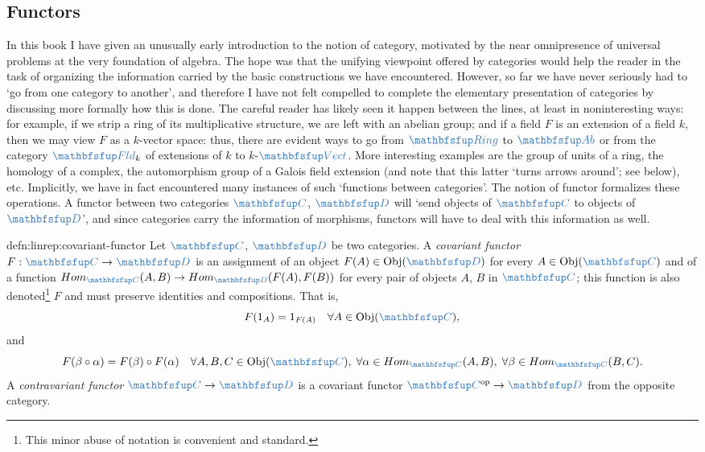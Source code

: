 \subsection{Functors}
\label{subsec:linrep:functors}
In this book I have given an unusually early introduction to the
notion of category, motivated by the near omnipresence of universal
problems at the very foundation of algebra. The hope was that the
unifying viewpoint offered by categories would help the reader in the
task of organizing the information carried by the basic constructions
we have encountered.  However, so far we have never seriously had to
`go from one category to another', and therefore I have not felt
compelled to complete the elementary presentation of categories by
discussing more formally how this is done. The careful reader has
likely seen it happen between the lines, at least in noninteresting
ways: for example, if we strip a ring of its multiplicative structure,
we are left with an abelian group; and if a field $F$ is an extension
of a field $k$, then we may view $F$ as a $k$-vector space: thus,
there are evident ways to go from $\categ{Ring}$ to $\categ{Ab}$ or
from the category $\categ{Fld}_k$ of extensions of $k$ to
$k$-$\categ{Vect}$. More interesting examples are the group of units
of a ring, the homology of a complex, the automorphism group of a
Galois field extension (and note that this latter `turns arrows
around'; see below), etc. Implicitly, we have in fact encountered many
instances of such `functions between categories'.  The notion of
functor formalizes these operations. A functor between two categories
$\categ{C}$, $\categ{D}$ will `send objects of $\categ{C}$ to objects
of $\categ{D}$', and since categories carry the information of
morphisms, functors will have to deal with this information as well.
\begin{defn}{}{defn:linrep:covariant-functor}
  Let $\categ{C}$, $\categ{D}$ be two categories. A \emph{covariant
    functor} $F : \categ{C} \to \categ{D}$ is an assignment of an
  object $F(A) \in \mathrm{Obj}(\categ{D})$ for every
  $A \in \mathrm{Obj}(\categ{C})$ and of a function
  $\Hom_{\categ{C}}(A, B) \to \Hom_{\categ{D}}(F(A), F(B))$ for every
  pair of objects $A$, $B$ in $\categ{C}$; this function is also
  denoted\footnote{This minor abuse of notation is convenient and
    standard.} $F$ and must preserve identities and compositions. That
  is,
  \[
    F(1_A) = 1_{F(A)} \quad \forall A \in \mathrm{Obj}(\categ{C}),
  \]
  and
  \[
    F(\beta \circ \alpha) = F(\beta) \circ F(\alpha) \quad \forall A,
    B, C \in \mathrm{Obj}(\categ{C}),\; \forall \alpha \in
    \Hom_{\categ{C}}(A, B),\; \forall \beta \in \Hom_{\categ{C}}(B,
    C).
  \]
  A \emph{contravariant functor} $\categ{C} \to \categ{D}$ is a
  covariant functor $\categ{C}^{\mathrm{op}} \to \categ{D}$ from the
  opposite category.
\end{defn}
